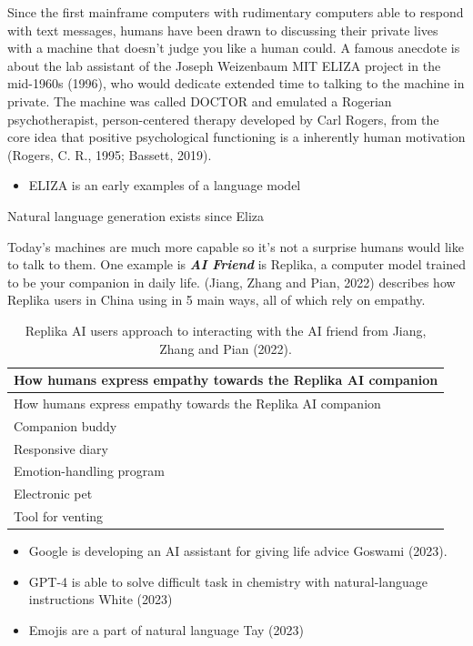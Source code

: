 \documentclass[
  letterpaper,
  DIV=11,
  numbers=noendperiod]{scrartcl}
\providecommand{\tightlist}{%
  \setlength{\itemsep}{0pt}\setlength{\parskip}{0pt}}\usepackage{longtable,booktabs,array}
\begin{document}
Since the first mainframe computers with rudimentary computers able to
respond with text messages, humans have been drawn to discussing their
private lives with a machine that doesn't judge you like a human could.
A famous anecdote is about the lab assistant of the Joseph Weizenbaum
MIT ELIZA project in the mid-1960s (1996), who would dedicate extended
time to talking to the machine in private. The machine was called DOCTOR
and emulated a Rogerian psychotherapist, person-centered therapy
developed by Carl Rogers, from the core idea that positive psychological
functioning is a inherently human motivation (Rogers, C. R., 1995;
Bassett, 2019).

\begin{itemize}
\tightlist
\item
  ELIZA is an early examples of a language model
\end{itemize}

Natural language generation exists since Eliza

Today's machines are much more capable so it's not a surprise humans
would like to talk to them. One example is \textbf{\emph{AI Friend}} is
Replika, a computer model trained to be your companion in daily life.
(Jiang, Zhang and Pian, 2022) describes how Replika users in China using
in 5 main ways, all of which rely on empathy.

\begin{longtable}[]{@{}l@{}}
\caption{Replika AI users approach to interacting with the AI friend
from Jiang, Zhang and Pian (2022).}\tabularnewline
\toprule\noalign{}
How humans express empathy towards the Replika AI companion \\
\midrule\noalign{}
\endfirsthead
\toprule\noalign{}
How humans express empathy towards the Replika AI companion \\
\midrule\noalign{}
\endhead
\bottomrule\noalign{}
\endlastfoot
Companion buddy \\
Responsive diary \\
Emotion-handling program \\
Electronic pet \\
Tool for venting \\
\end{longtable}

\begin{itemize}
\tightlist
\item
  Google is developing an AI assistant for giving life advice Goswami
  (2023).
\item
  GPT-4 is able to solve difficult task in chemistry with
  natural-language instructions White (2023)
\item
  Emojis are a part of natural language Tay (2023)
\end{itemize}
\end{document}
